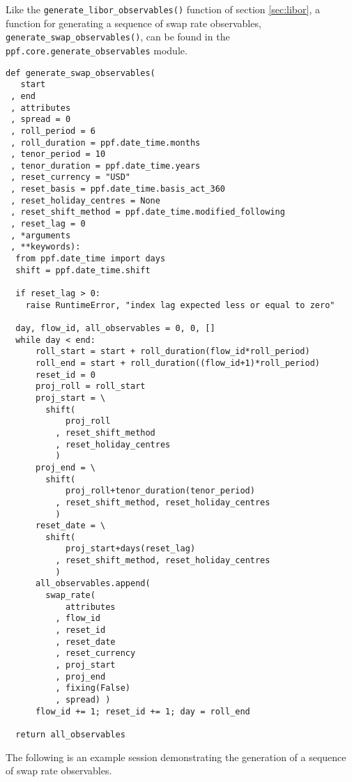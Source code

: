 Like the \verb|generate_libor_observables()| function of section
\ref{sec:libor}, a function for generating a sequence of swap rate
observables, \verb|generate_swap_observables()|, can be found in the
\verb|ppf.core.generate_observables| module.
\begin{verbatim}
def generate_swap_observables(
   start
 , end
 , attributes
 , spread = 0
 , roll_period = 6
 , roll_duration = ppf.date_time.months
 , tenor_period = 10
 , tenor_duration = ppf.date_time.years
 , reset_currency = "USD"
 , reset_basis = ppf.date_time.basis_act_360
 , reset_holiday_centres = None
 , reset_shift_method = ppf.date_time.modified_following
 , reset_lag = 0
 , *arguments
 , **keywords):
  from ppf.date_time import days
  shift = ppf.date_time.shift

  if reset_lag > 0:
    raise RuntimeError, "index lag expected less or equal to zero"

  day, flow_id, all_observables = 0, 0, []
  while day < end:
      roll_start = start + roll_duration(flow_id*roll_period)
      roll_end = start + roll_duration((flow_id+1)*roll_period)
      reset_id = 0
      proj_roll = roll_start
      proj_start = \
        shift(
            proj_roll
          , reset_shift_method
          , reset_holiday_centres
          )
      proj_end = \
        shift(
            proj_roll+tenor_duration(tenor_period)
          , reset_shift_method, reset_holiday_centres
          )
      reset_date = \
        shift(
            proj_start+days(reset_lag)
          , reset_shift_method, reset_holiday_centres
          )
      all_observables.append(
        swap_rate(
            attributes
          , flow_id
          , reset_id
          , reset_date
          , reset_currency
          , proj_start
          , proj_end
          , fixing(False)
          , spread) )
      flow_id += 1; reset_id += 1; day = roll_end

  return all_observables
\end{verbatim}
The following is an example session demonstrating the generation of a sequence
of swap rate observables.
